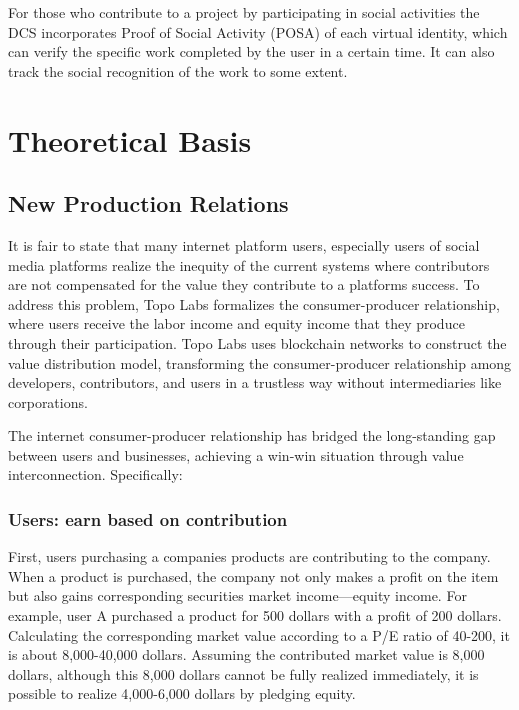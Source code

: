 \documentclass{article}
\begin{document}
For those who contribute to a project by participating in social activities the DCS incorporates Proof of Social Activity (POSA) of each virtual identity, which can verify the specific work completed by the user in a certain time. It can also track the social recognition of the work to some extent. 


\section{Theoretical Basis}

\subsection{New Production Relations}
It is fair to state that many internet platform users, especially users of social media platforms realize the inequity of the current systems where contributors are not compensated for the value they contribute to a platforms success. To address this problem, Topo Labs formalizes the consumer-producer relationship, where users receive the labor income and equity income that they produce through their participation. Topo Labs uses blockchain networks to construct the value distribution model, transforming the consumer-producer relationship among developers, contributors, and users in a trustless way without intermediaries like corporations.

The internet consumer-producer relationship has bridged the long-standing gap between users and businesses, achieving a win-win situation through value interconnection. Specifically:

\subsubsection{Users: earn based on contribution}

First, users purchasing a companies products are contributing to the company. When a product is purchased, the company not only makes a profit on the item but also gains corresponding securities market income—equity income. For example, user A purchased a product for 500 dollars with a profit of 200 dollars. Calculating the corresponding market value according to a P/E ratio of 40-200, it is about 8,000-40,000 dollars. Assuming the contributed market value is 8,000 dollars, although this 8,000 dollars cannot be fully realized immediately, it is possible to realize 4,000-6,000 dollars by pledging equity. 
\end{document}
